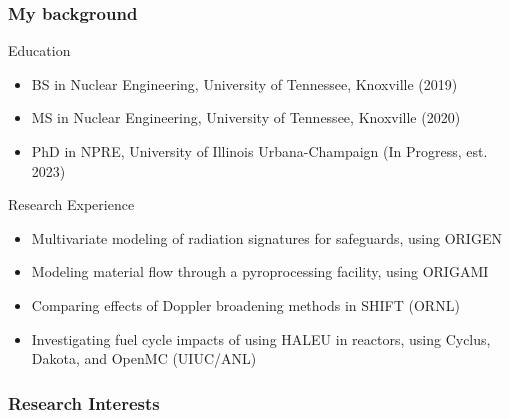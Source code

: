 \begin{frame}
    \frametitle{My background}
    Education 
    \begin{itemize}
        \item BS in Nuclear Engineering, University of Tennessee, Knoxville (2019)
        \item MS in Nuclear Engineering, University of Tennessee, Knoxville (2020)
        \item PhD in NPRE, University of Illinois Urbana-Champaign (In Progress, est. 2023)
    \end{itemize}
    Research Experience
    \begin{itemize}
        \item Multivariate modeling of radiation signatures for safeguards, using ORIGEN
        \item Modeling material flow through a pyroprocessing facility, using ORIGAMI
        \item Comparing effects of Doppler broadening methods in SHIFT (ORNL)
        \item Investigating fuel cycle impacts of using \gls{HALEU} in reactors,
              using Cyclus, Dakota, and OpenMC (UIUC/ANL)
    \end{itemize}

\end{frame}

\begin{frame}
    \frametitle{Research Interests}
    
\end{frame}